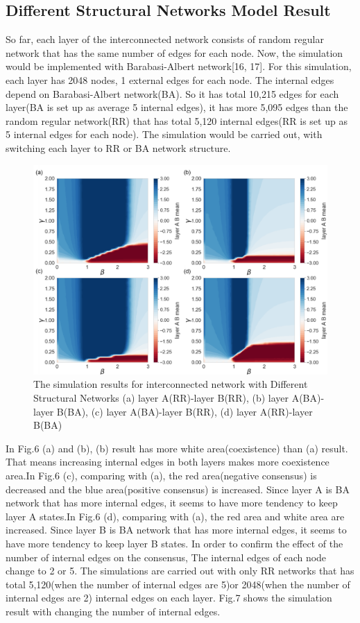 \documentclass[english]{cccconf}
\begin{document}
\subsection{Different Structural Networks Model Result}
So far, each layer of the interconnected network consists of random regular network that has the same number of edges for each node. Now, the simulation would be implemented with Barabasi-Albert network[16, 17]. For this simulation, each layer has 2048 nodes, 1 external edges for each node. The internal edges depend on Barabasi-Albert network(BA). So it has total 10,215 edges for each layer(BA is set up as average 5 internal edges), it has more 5,095 edges than the random regular network(RR) that has total 5,120 internal edges(RR is set up as 5 internal edges for each node). The simulation would be carried out, with switching each layer to RR or BA network structure.
\begin{figure}[!htb]
  \centering
  \includegraphics[width=\hsize]{FIG6.png}
  \caption{The simulation results for interconnected network with Different Structural Networks (a) layer A(RR)-layer B(RR), (b) layer A(BA)-layer B(BA), (c) layer A(BA)-layer B(RR), (d) layer A(RR)-layer B(BA)}
  \label{Fig6}
\end{figure}
In Fig.6 (a) and (b), (b) result has more white area(coexistence) than (a) result. That means increasing internal edges in both layers makes more coexistence area.In Fig.6 (c), comparing with (a), the red area(negative consensus) is decreased and the blue area(positive consensus) is increased. Since layer A is BA network that has more internal edges, it seems to have more tendency to keep layer A states.In Fig.6 (d), comparing with (a), the red area and white area are increased. Since layer B is BA network that has more internal edges, it seems to have more tendency to keep layer B states. In order to confirm the effect of the number of internal edges on the consensus, The internal edges of each node change to 2 or 5. The simulations are carried out with only RR networks that has total 5,120(when the number of internal edges are 5)or 2048(when the number of internal edges are 2) internal edges on each layer. Fig.7 shows the simulation result with changing the number of internal edges.
\end{document}
